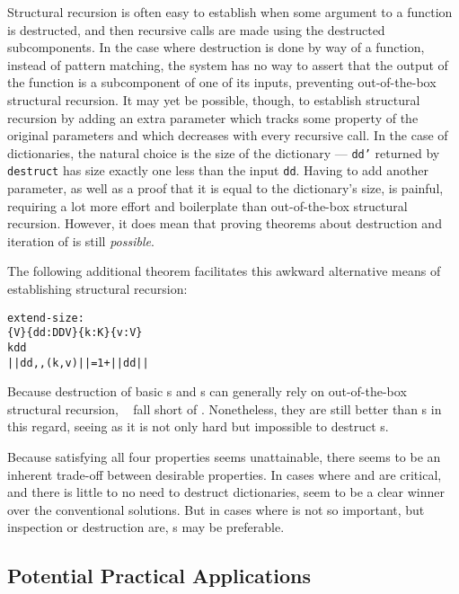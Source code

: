 Structural recursion is often easy to establish when some argument to a function is destructed, and then recursive calls are made using the destructed subcomponents.
In the case where destruction is done by way of a function, instead of pattern matching,
the system has no way to assert that the output of the function is a subcomponent of one of its inputs,
preventing out-of-the-box structural recursion.
It may yet be possible, though, to establish structural recursion by adding an extra parameter which tracks some property of the original parameters and which decreases with every recursive call.
In the case of dictionaries, the natural choice is the size of the dictionary --- \texttt{dd'} returned by \verb+destruct+ has size exactly one less than the input \texttt{dd}.
Having to add another parameter, as well as a proof that it is equal to the dictionary's size, is painful, requiring a lot more effort and boilerplate than out-of-the-box structural recursion.
However, it does mean that proving theorems about destruction and iteration of \dds{} is still \emph{possible}.

The following additional theorem facilitates this awkward alternative means of establishing structural recursion:

\begin{alltt}
  extend-size :
    \altFAll\{V\} \{dd : DD V\} \{k : K\} \{v : V\} \altRArr
      k \altNIn dd \altRArr
      || dd ,, (k , v) || = 1 + || dd ||
\end{alltt}

Because destruction of basic {\sal}s and {\cal}s can generally rely on out-of-the-box structural recursion, \dds~ fall short of \EzDstr.
Nonetheless, they are still better than {\fpf}s in this regard, seeing as it is not only hard but impossible to destruct {\fpf}s.

Because satisfying all four properties seems unattainable,
there seems to be an
inherent trade-off between desirable properties. In cases where \SemTot{} and \EqDec{} are critical,
and there is little to no need to destruct dictionaries, \dds{} seem to be a clear winner over
the conventional solutions. But in cases where \SemTot{} is not so important,
but inspection or destruction are, {\cal}s may be preferable.

\subsection{Potential Practical Applications}
\label{sec:Discussion:Generality}

